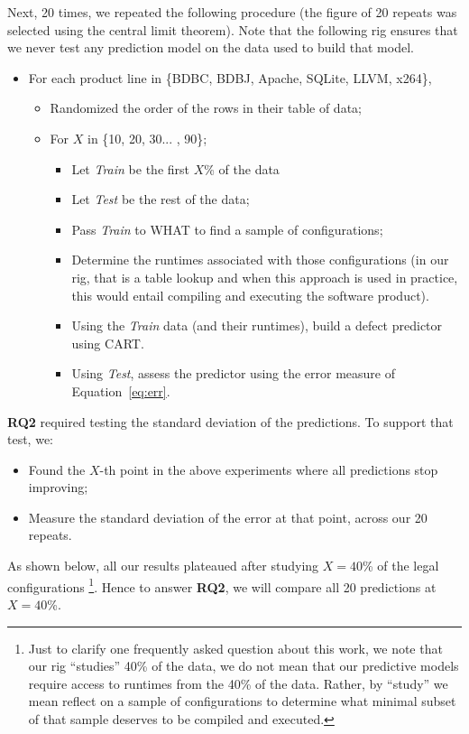 \documentclass{sig-alternative}
\newcommand{\bi}{\begin{itemize}}%
\newcommand{\ei}{\end{itemize}}
\newcommand{\eq}[1]{Equation~\ref{eq:#1}}
\begin{document}
Next, 20 times, we repeated the following procedure (the figure of 20 repeats was
selected using the central limit theorem). Note that the following rig ensures that
we never test any prediction model on the data used to build that model.
\bi
\item For each  product line in \{BDBC, BDBJ, Apache, SQLite, LLVM, x264\},
\bi
\item Randomized the order of the rows in their table of data;
\item For $X$ in \{10, 20, 30... , 90\};
\bi
\item Let {\em Train} be the first $X$\% of the data 
\item Let {\em Test} be the rest of the data;
\item Pass {\em Train} to WHAT to find a sample of configurations;
\item Determine the runtimes associated with those configurations (in our rig, that is a table lookup and when
this approach is used in practice, this would entail compiling and executing the software product).
\item Using the {\em Train}  data (and their runtimes), build a defect predictor using CART.
\item Using {\em Test}, assess the predictor using the error 
measure of \eq{err}.
\ei
\ei
\ei
{\bf RQ2} required testing the standard deviation of the predictions. To support that test, we:
\bi
\item Found the $X$-th point in the above experiments where all predictions stop improving;
\item Measure the standard deviation of the error at that point, across our 20 repeats.
\ei
As shown below, all our results plateaued after studying $X=40$\% of the legal configurations
 \footnote{Just to clarify one frequently asked question about this work, we note
that our rig ``studies'' 40\% of the data, we do not mean that our predictive models
 require access to runtimes from the 40\% of the data. Rather, by ``study'' we mean   reflect 
 on a sample of configurations to determine what minimal subset of that
sample deserves to be compiled and executed.}.
 Hence to answer {\bf RQ2}, we will compare all 20 predictions at $X=40$\%.
 
\end{document}
